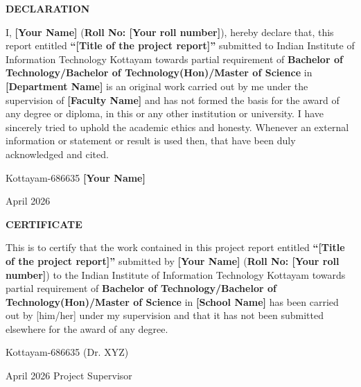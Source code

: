 \documentclass[12pt,a4wide]{report}
\theoremstyle{plain}
\theoremstyle{definition}
\theoremstyle{remark}
\begin{document}
\clearpage
 \setcounter{page}{2}
\begin{center}
{\large{\bf{DECLARATION}}}
\end{center}


\noindent I, \textbf{[Your Name]} (\textbf{Roll No: [Your roll
number]}), hereby declare that, this report entitled
\textbf{``[Title of the project report]''} submitted to Indian
Institute of Information Technology Kottayam towards partial
requirement of {\bf Bachelor of Technology/Bachelor of
Technology(Hon)/Master of Science} in \textbf{[Department  Name]}
is an original work carried out by me under the supervision of
\textbf{[Faculty Name]} and has not formed the basis for the award
of any degree or diploma, in this or any other institution or
university. I have sincerely tried to uphold the academic ethics
and honesty. Whenever an external information or statement or
result is used then, that have been duly acknowledged and cited.

\vspace{4cm}

\noindent Kottayam-686635 \hfill \textbf{[Your Name]}

\noindent April  2026

\clearpage


 \setcounter{page}{3}
\begin{center}
{\large{\bf{CERTIFICATE}}}
\end{center}


\noindent This is to certify that the work contained in this
project report entitled \textbf{``[Title of the project report]''}
submitted by \textbf{[Your Name]} (\textbf{Roll No: [Your roll
number]}) to the Indian Institute of Information Technology Kottayam
towards partial requirement of {\bf Bachelor of
Technology/Bachelor of Technology(Hon)/Master of Science} in
\textbf{[School Name]} has been carried out by [him/her] under my
supervision and that it has not been submitted elsewhere for the
award of any degree.


\vspace{4cm}

\noindent Kottayam-686635  \hfill (Dr. XYZ)

\noindent April  2026 \hfill Project Supervisor

\clearpage
\end{document}
